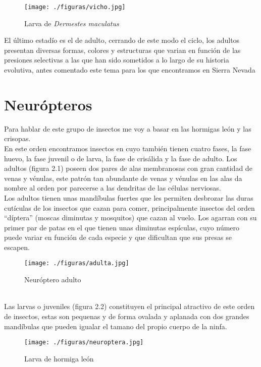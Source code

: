 \documentclass[a4paper,openright,12pt]{book}
\begin{document}
\begin{figure}
\begin{center}
\texttt{[image: ./figuras/vicho.jpg]}
\caption{\footnotesize Larva de \textit{Dermestes maculatus}}
\label{figura 1.2}
\end{center}
\end{figure}
El \'{u}ltimo estad\'{i}o es el de adulto, cerrando de este modo el ciclo, los adultos presentan diversas formas, colores y estructuras que varian en funci\'{o}n de las presiones selectivas a las que han sido sometidos a lo largo de su historia evolutiva, antes comentado este tema para los que encontramos en Sierra Nevada
\chapter{Neur\'{o}pteros}
Para hablar de este grupo de insectos me voy a basar en las hormigas le\'{o}n y las crisopas.\\
En este orden encontramos insectos en cuyo tambi\'{e}n tienen cuatro fases, la fase huevo, la fase juvenil o de larva, la fase de cris\'{a}lida y la fase de adulto. Los adultos (figura 2.1) poseen dos pares de alas membranosas con gran cantidad de venas y v\'{e}nulas, este patr\'{o}n tan abundante de venas y v\'{e}nulas en las alas da nombre al orden por parecerse a las 	dendritas de las c\'{e}lulas nerviosas. \\ 

Los adultos tienen unas mand\'{i}bulas fuertes que les permiten desbrozar las duras cut\'{i}culas de los insectos que cazan para comer, principalmente insectos del orden ``d\'{i}ptera'' (moscas diminutas y mosquitos) que cazan al vuelo. Los agarran con su primer par de patas en el que tienen unas diminutas esp\'{i}culas, cuyo n\'{u}mero puede variar en funci\'{o}n de cada especie y que dificultan que sus presas se escapen. \\
\begin{figure}
\begin{center}
\texttt{[image: ./figuras/adulta.jpg]}
\label{figura 2.1}
\caption{\footnotesize Neur\'{o}ptero adulto}
\end{center}
\end{figure} \\
Las larvas o juveniles (figura 2.2) constituyen el principal atractivo de este orden de insectos, estas 	son pequenas y de forma ovalada y aplanada con dos grandes mand\'{i}bulas que pueden igualar el tamano del propio cuerpo de la ninfa. 
\begin{figure}
\begin{center}
\texttt{[image: ./figuras/neuroptera.jpg]} 
\caption{\footnotesize  Larva de hormiga le\'{o}n}
\label{figura 2.2}
\end{center}
\end{figure}
\end{document}
